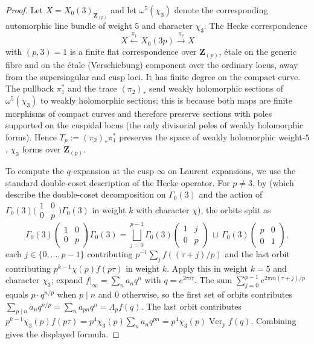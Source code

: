 \documentclass[11pt]{amsart}
\theoremstyle{definition}
\theoremstyle{remark}
\newcommand{\Z}{\mathbf{Z}}
\begin{document}
\begin{proof}
Let $X=X_0(3)_{\Z_{(p)}}$ and let $\omega^5(\chi_3)$ denote the corresponding automorphic line bundle of weight $5$ and character $\chi_3$. The Hecke correspondence
\[
X\xleftarrow{\pi_1} X_0(3p)\xrightarrow{\pi_2} X
\]
with $(p,3)=1$ is a finite flat correspondence over $\Z_{(p)}$, étale on the generic fibre and on the étale (Verschiebung) component over the ordinary locus, away from the supersingular and cusp loci. It has finite degree on the compact curve. The pullback $\pi_1^*$ and the trace $(\pi_2)_*$ send weakly holomorphic sections of $\omega^5(\chi_3)$ to weakly holomorphic sections; this is because both maps are finite morphisms of compact curves and therefore preserve sections with poles supported on the cuspidal locus (the only divisorial poles of weakly holomorphic forms). Hence $T_p:=(\pi_2)_*\pi_1^*$ preserves the space of weakly holomorphic weight-$5$, $\chi_3$ forms over $\Z_{(p)}$.

To compute the $q$-expansion at the cusp $\infty$ on Laurent expansions, we use the standard double-coset description of the Hecke operator. For $p\ne 3$, by \cite[Lem.~5.1.1 and Prop.~5.2.1]{DS} (which describe the double-coset decomposition on $\Gamma_0(3)$ and the action of $\Gamma_0(3)\bigl(\begin{smallmatrix}1&0\\0&p\end{smallmatrix}\bigr)\Gamma_0(3)$ in weight $k$ with character $\chi$), the orbits split as
\[
\Gamma_0(3)\!\begin{pmatrix}1&0\\0&p\end{pmatrix}\!\Gamma_0(3)=\bigsqcup_{j=0}^{p-1}\Gamma_0(3)\begin{pmatrix}1&j\\0&p\end{pmatrix}\,\sqcup\,\Gamma_0(3)\begin{pmatrix}p&0\\0&1\end{pmatrix},
\]
each $j\in\{0,\dots,p-1\}$ contributing $p^{-1}\sum_jf((\tau+j)/p)$ and the last orbit contributing $p^{k-1}\chi(p)f(p\tau)$ in weight $k$. Apply this in weight $k=5$ and character $\chi_3$; expand $f|_\infty=\sum_n a_nq^n$ with $q=e^{2\pi i\tau}$. The sum $\sum_{j=0}^{p-1}e^{2\pi i n(\tau+j)/p}$ equals $p\cdot q^{n/p}$ when $p\mid n$ and $0$ otherwise, so the first set of orbits contributes $\sum_{p\mid n}a_n q^{n/p}=\sum_{n}a_{pn}q^n=\Lambda_p f(q)$. The last orbit contributes $p^{k-1}\chi_3(p)f(p\tau)=p^4\chi_3(p)\sum_n a_n q^{pn}=p^4\chi_3(p)\operatorname{Ver}_p f(q)$. Combining gives the displayed formula.


\end{proof}
\end{document}
